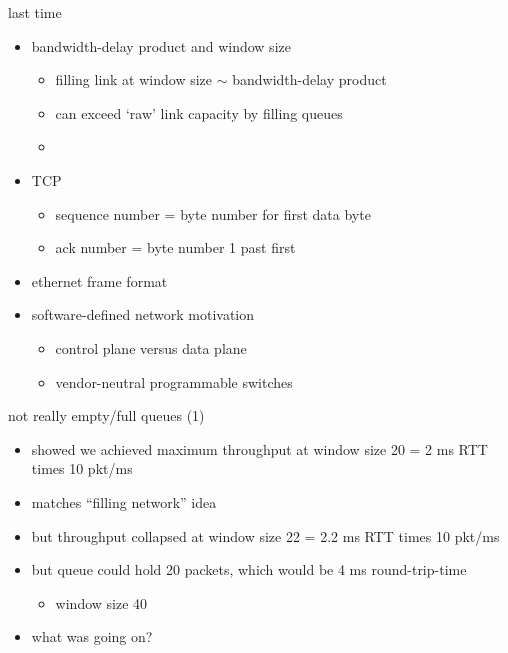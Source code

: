 \date{}
\title{}
\date{}

\begin{frame}
    \titlepage
\end{frame}

\begin{frame}{last time}
    \begin{itemize}
    \item bandwidth-delay product and window size
        \begin{itemize}
        \item filling link at window size $\sim$ bandwidth-delay product
        \item can exceed `raw' link capacity by filling queues
        \item {}
        \end{itemize}
    \item TCP
        \begin{itemize}
        \item sequence number = byte number for first data byte
        \item ack number = byte number 1 past first
        \end{itemize}
    \item ethernet frame format
    \item software-defined network motivation
        \begin{itemize}
        \item control plane versus data plane
        \item vendor-neutral programmable switches
        \end{itemize}
    \end{itemize}
\end{frame}

\begin{frame}{not really empty/full queues (1)}
    \begin{itemize}
    \item showed we achieved maximum throughput at window size 20 = 2 ms RTT times 10 pkt/ms
    \item matches ``filling network'' idea
    \vspace{.5cm}
    \item<2-> but throughput collapsed at window size 22 = 2.2 ms RTT times 10 pkt/ms
    \item<2-> but queue could hold 20 packets, which would be 4 ms round-trip-time
        \begin{itemize}
        \item window size 40
        \end{itemize}
    \item<2-> what was going on?
    \end{itemize}
\end{frame}

